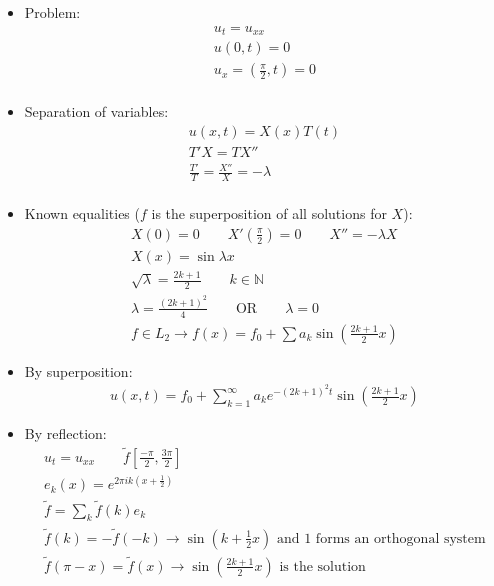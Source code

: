 \documentclass[12pt, a4paper]{article}
\begin{document}
\begin{itemize}
    \item Problem:
    \begin{gather*}
        u_t = u_{xx}\\
        u(0, t) = 0\\
        u_x = (\frac{\pi}{2}, t) = 0\\
    \end{gather*}
    \item Separation of variables:
    \begin{gather*}
        u(x, t) = X(x)T(t)\\
        T'X = TX''\\
        \frac{T'}{T} = \frac{X''}{X} = -\lambda\\
    \end{gather*}
    \item Known equalities ($f$ is the superposition of all solutions for $X$):
    \begin{gather*}
        X(0) = 0 \qquad X'(\frac{\pi}{2})=0 \qquad X'' = -\lambda X\\
        X(x) = \sin \lambda x\\
        \sqrt{\lambda} = \frac{2k+1}{2} \qquad k \in \mathbb{N}\\
        \lambda = \frac{(2k+1)^2}{4} \qquad \text{OR} \qquad \lambda = 0\\
        f \in L_2 \rightarrow f(x) = f_0 + \sum a_k\sin(\frac{2k+1}{2}x)
    \end{gather*}
    \item By superposition:
    \begin{gather*}
        u(x, t) = f_0 + \sum_{k=1}^\infty a_k e^{-(2k+1)^2t}\sin(\frac{2k+1}{2}x)
    \end{gather*}
    \item By reflection:
    \begin{gather*}
        u_t = u_{xx} \qquad \tilde{f}[\frac{-\pi}{2}, \frac{3\pi}{2}]\\
        e_k(x) = e^{2\pi ik(x+\frac{1}{2})}\\
        \tilde{f} = \sum_k \tilde{f}(k)e_k\\
        \tilde{f}(k) = -\tilde{f}(-k)\rightarrow \text{$\sin\left(k+\frac{1}{2}x\right)$ and 1 forms an orthogonal system}\\
        \tilde{f}(\pi-x) = \tilde{f}(x) \rightarrow \text{$\sin\left(\frac{2k+1}{2}x\right)$ is the solution}\\
    \end{gather*}
\end{itemize}
\end{document}
